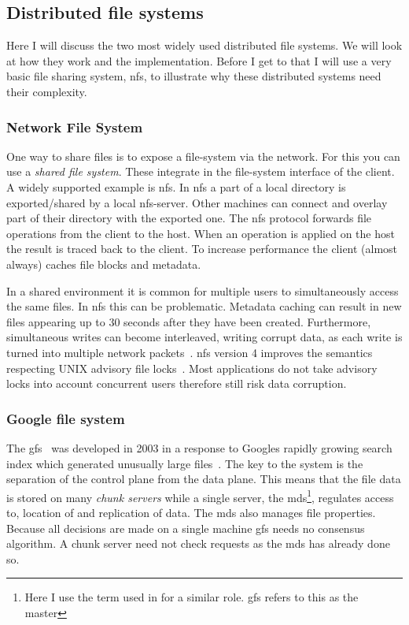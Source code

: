 \subsection{Distributed file systems}
Here I will discuss the two most widely used distributed file systems. We will look at how they work and the implementation. Before I get to that I will use a very basic file sharing system, \ac{nfs}, to illustrate why these distributed systems need their complexity.

\subsubsection*{Network File System}
One way to share files is to expose a file-system via the network. For this you can use a \textit{shared file system}. These integrate in the file-system interface of the client. A widely supported example is \acf{nfs}. In \ac{nfs} a part of a local directory is exported/shared by a local \ac{nfs}-server. Other machines can connect and overlay part of their directory with the exported one. The \ac{nfs} protocol forwards file operations from the client to the host. When an operation is applied on the host the result is traced back to the client. To increase performance the client (almost always) caches file blocks and metadata. 

In a shared environment it is common for multiple users to simultaneously access the same files. In \ac{nfs} this can be problematic. Metadata caching can result in new files appearing up to 30 seconds after they have been created. Furthermore, simultaneous writes can become interleaved, writing corrupt data, as each write is turned into multiple network packets~\cite[p. 527]{os}. \ac{nfs} version 4 improves the semantics respecting UNIX advisory file locks~\cite{rfc3530}. Most applications do not take advisory locks into account concurrent users therefore still risk data corruption. 

\subsubsection*{Google file system}
The \ac{gfs}~\cite{GFS} was developed in 2003 in a response to Googles rapidly growing search index which generated unusually large files~\cite{GFS_interview}. The key to the system is the separation of the control plane from the data plane. This means that the file data is stored on many \textit{chunk servers} while a single server, the \ac{mds}\footnote{Here I use the term used in \ceph{} for a similar role. \ac{gfs} refers to this as the master}, regulates access to, location of and replication of data. The \ac{mds} also manages file properties. Because all decisions are made on a single machine \ac{gfs} needs no consensus algorithm. A chunk server need not check requests as the \ac{mds} has already done so. 

